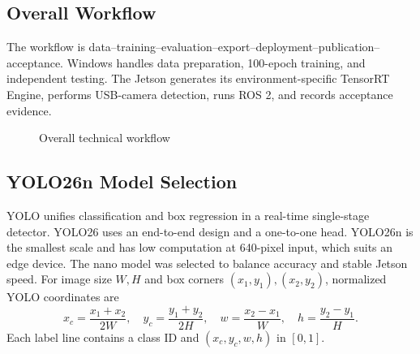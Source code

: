 \documentclass[UTF8,zihao=-4,scheme=chinese,fontset=none]{ctexart}
\begin{document}
\subsection{Overall Workflow}
The workflow is data--training--evaluation--export--deployment--publication--acceptance. Windows handles data preparation, 100-epoch training, and independent testing. The Jetson generates its environment-specific TensorRT Engine, performs USB-camera detection, runs ROS 2, and records acceptance evidence.
\begin{figure}[H]\centering
{}\caption{Overall technical workflow}\label{fig:pipeline}\end{figure}
\subsection{YOLO26n Model Selection}
YOLO unifies classification and box regression in a real-time single-stage detector. YOLO26 uses an end-to-end design and a one-to-one head. YOLO26n is the smallest scale and has low computation at 640-pixel input, which suits an edge device\cite{yolo26paper,yolo26docs}. The nano model was selected to balance accuracy and stable Jetson speed.
For image size $W,H$ and box corners $(x_1,y_1),(x_2,y_2)$, normalized YOLO coordinates are
\begin{equation}x_c=\frac{x_1+x_2}{2W},\quad y_c=\frac{y_1+y_2}{2H},\quad w=\frac{x_2-x_1}{W},\quad h=\frac{y_2-y_1}{H}.\end{equation}
Each label line contains a class ID and $(x_c,y_c,w,h)$ in $[0,1]$.
\end{document}
